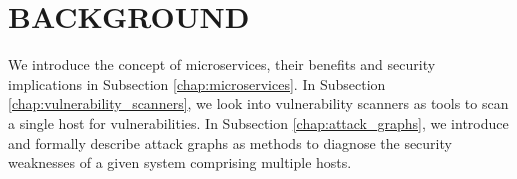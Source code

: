 \section{BACKGROUND}
\label{chap:background}

We introduce the concept of microservices, their benefits and security implications in Subsection \ref{chap:microservices}. In Subsection \ref{chap:vulnerability_scanners}, we look into vulnerability scanners as tools to scan a single host for vulnerabilities. In Subsection \ref{chap:attack_graphs}, we introduce and formally describe attack graphs as methods to diagnose the security weaknesses of a given system comprising multiple hosts.





